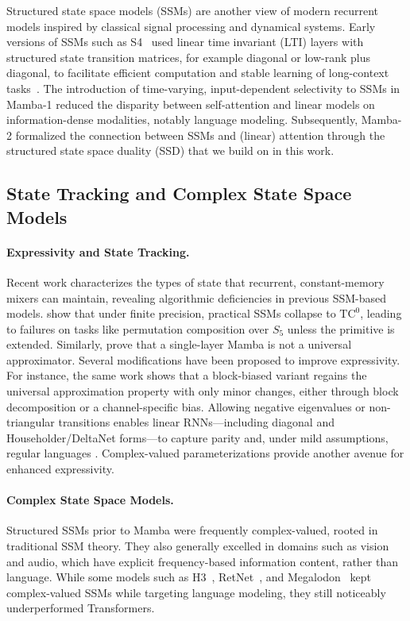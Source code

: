 Structured state space models (SSMs) are another view of modern recurrent models inspired by classical signal processing and dynamical systems.
Early versions of SSMs such as S4~\citep{S4,S5,DSS} used linear time invariant (LTI) layers with structured state transition matrices, for example diagonal or low-rank plus diagonal, to facilitate efficient computation and stable learning of long-context tasks~\citep{S4,S5,DSS}.
The introduction of time-varying, input-dependent selectivity to SSMs in Mamba-1 \citep{gu2024mambalineartimesequencemodeling} reduced the disparity between self-attention and linear models on information-dense modalities, notably language modeling.
Subsequently, Mamba-2 \citep{dao2024transformersssmsgeneralizedmodels} formalized the connection between SSMs and (linear) attention through the structured state space duality (SSD) that we build on in this work.

\subsection{State Tracking and Complex State Space Models}

\paragraph{Expressivity and State Tracking.}
Recent work characterizes the types of state that recurrent, constant-memory mixers can maintain, revealing algorithmic deficiencies in previous SSM-based models. \citet{merrill2025illusionstatestatespacemodels} show that under finite precision, practical SSMs collapse to $\mathrm{TC}^0$, leading to failures on tasks like permutation composition over $S_5$ unless the primitive is extended.
Similarly, \citet{yu2025blockbiasedmamba} prove that a single-layer Mamba is not a universal approximator. Several modifications have been proposed to improve expressivity. For instance, the same work shows that a block-biased variant regains the universal approximation property with only minor changes, either through block decomposition or a channel-specific bias. Allowing negative eigenvalues or non-triangular transitions enables linear RNNs---including diagonal and Householder/DeltaNet forms---to capture parity and, under mild assumptions, regular languages \citep{grazzi2025unlockingstatetrackinglinearrnns}. Complex-valued parameterizations provide another avenue for enhanced expressivity.

\paragraph{Complex State Space Models.}
Structured SSMs prior to Mamba were frequently complex-valued, rooted in traditional SSM theory.
They also generally excelled in domains such as vision and audio, which have explicit frequency-based information content, rather than language.
While some models such as H3~\citep{fu2023hungryhungryhipposlanguage}, RetNet~\citep{sun2023retentivenetworksuccessortransformer}, and Megalodon~\citep{ma2024megalodonefficientllmpretraining} kept complex-valued SSMs while targeting language modeling, they still noticeably underperformed Transformers.

